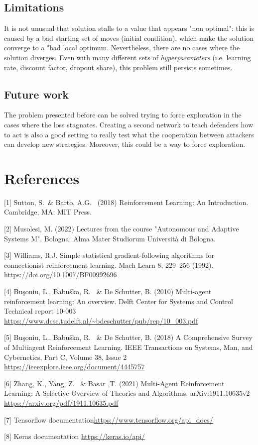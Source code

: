 \documentclass{article}
\begin{document}
\subsection{Limitations}
It is not unusual that solution stalls to a value that appears "non optimal": this is caused by a bad starting set of moves (initial condition), which make the solution converge to a "bad local optimum. Nevertheless, there are no cases where the solution diverges. Even with many different sets of \emph{hyperparameters} (i.e. learning rate, discount factor, dropout share), this problem still persists sometimes.

\subsection{Future work}
The problem presented before can be solved trying to force exploration in the cases where the loss stagnates.\newline
Creating a second network to teach defenders how to act is also a good setting to really test what the cooperation between attackers can develop new strategies. Moreover, this could be a way to force exploration.

\section*{References}

\medskip

{

[1] Sutton, S.\ \& Barto, A.G. \ (2018) Reinforcement Learning: An Introduction. Cambridge, MA: MIT Press.

[2] Musolesi, M. (2022) Lectures from the course "Autonomous and Adaptive Systems M". Bologna: Alma Mater Studiorum Università di Bologna.

[3] Williams, R.J. Simple statistical gradient-following algorithms for connectionist reinforcement learning. Mach Learn 8, 229–256 (1992). \url{https://doi.org/10.1007/BF00992696}

[4] Buşoniu, L., Babuška, R. \ \& De Schutter, B. (2010) Multi-agent reinforcement learning: An overview. Delft Center for Systems and Control Technical report 10-003 \url{https://www.dcsc.tudelft.nl/~bdeschutter/pub/rep/10_003.pdf}

[5] Buşoniu, L., Babuška, R. \ \& De Schutter, B. (2018) A Comprehensive Survey of Multiagent Reinforcement Learning. IEEE Transactions on Systems, Man, and Cybernetics, Part C, Volume 38, Issue 2  \url{https://ieeexplore.ieee.org/document/4445757}

[6] Zhang, K., Yang, Z. \ \& Basar ,T. (2021) Multi-Agent Reinforcement Learning: A Selective Overview of Theories and Algorithms. arXiv:1911.10635v2 \url{https://arxiv.org/pdf/1911.10635.pdf}

[7] Tensorflow documentation\url{https://www.tensorflow.org/api_docs/}

[8] Keras documentation \url{https://keras.io/api/}



}
\end{document}
